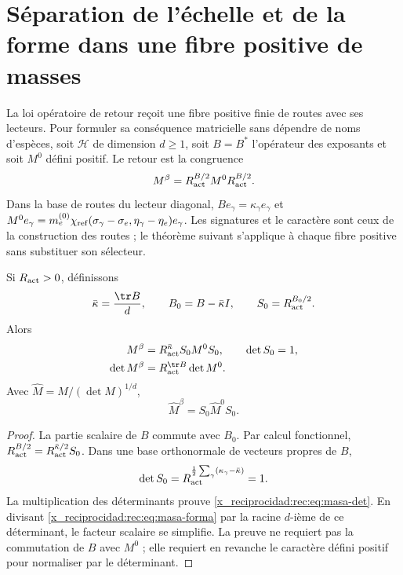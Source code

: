 \section{Séparation de l’échelle et de la forme dans une fibre positive de masses}

La loi opératoire de retour reçoit une fibre positive finie de routes avec ses lecteurs. Pour formuler sa conséquence matricielle sans dépendre de noms d’espèces, soit \(\mathcal H\) de dimension \(d\ge1\), soit \(B=B^*\) l’opérateur des exposants et soit \(M^0\) défini positif. Le retour est la congruence
\begin{equation}
 M^\beta=R_{\rm act}^{B/2}M^0R_{\rm act}^{B/2}.
 \label{x_reciprocidad:rec:eq:masa-operador}
\end{equation}
Dans la base de routes du lecteur diagonal, \(Be_\gamma=\kappa_\gamma e_\gamma\) et
\(M^0e_\gamma=m_e^{(0)}\chi_{\rm ref}(\sigma_\gamma-\sigma_e,\eta_\gamma-\eta_e)e_\gamma\). Les signatures et le caractère sont ceux de la construction des routes ; le théorème suivant s’applique à chaque fibre positive sans substituer son sélecteur.

\begin{theorem}
\label{x_reciprocidad:rec:thm:masa}
Si \(R_{\rm act}>0\), définissons
\[
 \bar\kappa=\frac{\tr B}{d},\qquad B_0=B-\bar\kappa I,
 \qquad S_0=R_{\rm act}^{B_0/2}.
\]
Alors
\begin{align}
 M^\beta&=R_{\rm act}^{\bar\kappa}S_0M^0S_0,
 \qquad\det S_0=1,\label{x_reciprocidad:rec:eq:masa-forma}\\
 \det M^\beta&=R_{\rm act}^{\tr B}\det M^0.\label{x_reciprocidad:rec:eq:masa-det}
\end{align}
Avec \(\widehat M=M/(\det M)^{1/d}\),
\begin{equation}
 \widehat M^\beta=S_0\widehat M^0S_0.
 \label{x_reciprocidad:rec:eq:masa-normalizada}
\end{equation}
\end{theorem}
\begin{proof}
La partie scalaire de \(B\) commute avec \(B_0\). Par calcul fonctionnel, \(R_{\rm act}^{B/2}=R_{\rm act}^{\bar\kappa/2}S_0\). Dans une base orthonormale de vecteurs propres de \(B\),
\[
 \det S_0=R_{\rm act}^{\frac12\sum_\gamma(\kappa_\gamma-\bar\kappa)}=1.
\]
La multiplication des déterminants prouve \eqref{x_reciprocidad:rec:eq:masa-det}. En divisant \eqref{x_reciprocidad:rec:eq:masa-forma} par la racine \(d\)-ième de ce déterminant, le facteur scalaire se simplifie. La preuve ne requiert pas la commutation de \(B\) avec \(M^0\) ; elle requiert en revanche le caractère défini positif pour normaliser par le déterminant.
\end{proof}

